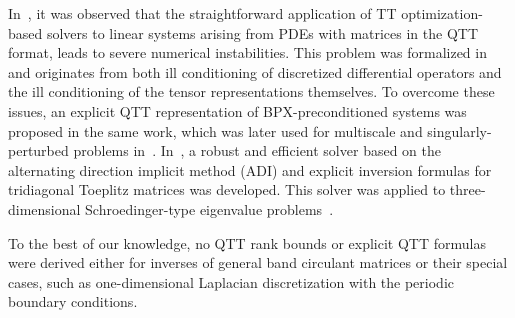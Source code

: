 \documentclass[a4paper]{article}
\begin{document}
In~\cite{cor-eccomas-2016,kazeev2018quantized,cor-robqtt-2016pre}, it was observed that the straightforward application of TT optimization-based solvers to linear systems arising from PDEs with matrices in the QTT format, leads to severe numerical instabilities.
This problem was formalized in~\cite{bachmayr2018stability} and originates from both ill conditioning of discretized differential operators and the ill conditioning of the tensor representations themselves.
To overcome these issues, an explicit QTT representation of BPX-preconditioned systems was proposed in the same work, which was later used for multiscale and singularly-perturbed problems in~\cite{kazeev2020quantized,marcati2020low}.
In~\cite{rakhuba2021robust}, a robust and efficient solver based on the alternating direction implicit method (ADI) and explicit inversion formulas for tridiagonal Toeplitz matrices was developed.
This solver was applied to three-dimensional Schroedinger-type eigenvalue problems~\cite{marcati2019tensor}.

To the best of our knowledge, no QTT rank bounds or explicit QTT formulas were derived either for inverses of general band circulant matrices or their special cases, such as one-dimensional Laplacian discretization with the periodic boundary conditions.


\end{document}
